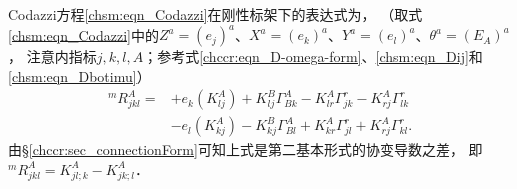 Codazzi方程\eqref{chsm:eqn_Codazzi}在刚性标架下的表达式为，
（取式\eqref{chsm:eqn_Codazzi}中的$Z^a=(e_j)^a$、$X^a=(e_k)^a$、$Y^a=(e_l)^a$、$\theta^a=(E_A)^a$，
注意内指标$j,k,l,A$；参考式\eqref{chccr:eqn_D-omega-form}、\eqref{chsm:eqn_Dij}和\eqref{chsm:eqn_Dbotimu}）
\begin{equation}\label{chsm:eqn_Codazzi-Frame}
    \begin{aligned}
        {}^{m}{R}^A_{jkl} =& +{e_k} ( K^A_{lj}) + K^B_{lj} \Gamma_{B k}^{A}
        -K^A_{lr} \Gamma_{jk}^{r} - K^A_{rj} \Gamma_{lk}^{r} \\
        &-{e_l} ( K^A_{kj})  - K^B_{kj} \Gamma_{B l}^{A}
        + K^A_{kr} \Gamma_{jl}^{r} +K^A_{rj} \Gamma_{kl}^{r}  .
    \end{aligned}
\end{equation}
由\S \ref{chccr:sec_connectionForm}可知上式是第二基本形式的协变导数之差，
即${}^{m}{R}^A_{jkl} =K^A_{jl;k}- K^A_{jk;l}$．
